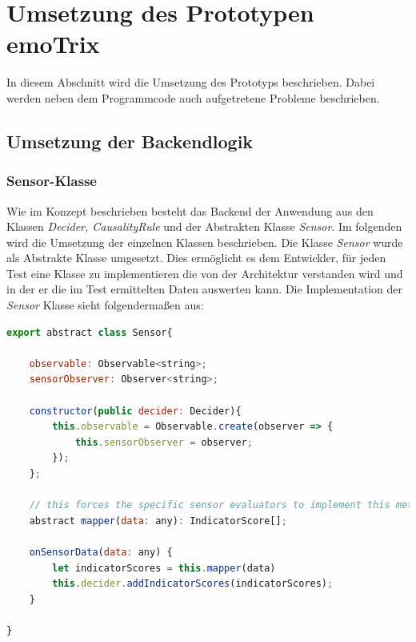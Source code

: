 \section{Umsetzung des Prototypen emoTrix}
In diesem Abschnitt wird die Umsetzung des Prototyps beschrieben. Dabei werden neben dem Programmcode auch aufgetretene Probleme beschrieben.
\subsection{Umsetzung der Backendlogik}
\subsubsection{Sensor-Klasse}
Wie im Konzept beschrieben besteht das Backend der Anwendung aus den Klassen \textit{Decider, CausalityRule} und der Abstrakten Klasse \textit{Sensor}. Im folgenden wird die Umsetzung der einzelnen Klassen beschrieben.\newline
Die Klasse \textit{Sensor} wurde als Abstrakte Klasse umgesetzt. Dies ermöglicht es dem Entwickler, für jeden Test eine Klasse zu implementieren die von der Architektur verstanden wird und in der er die im Test ermittelten Daten auswerten kann. Die Implementation der \textit{Sensor} Klasse sieht folgendermaßen aus: \newline
\begin{lstlisting}[caption={abstrakte Klasse Sensor},language=JavaScript]
export abstract class Sensor{

	observable: Observable<string>;
	sensorObserver: Observer<string>;

	constructor(public decider: Decider){
		this.observable = Observable.create(observer => {
			this.sensorObserver = observer;
		});
	};

	// this forces the specific sensor evaluators to implement this method
	abstract mapper(data: any): IndicatorScore[]; 

	onSensorData(data: any) {
		let indicatorScores = this.mapper(data)
		this.decider.addIndicatorScores(indicatorScores);
	}

}
\end{lstlisting}
